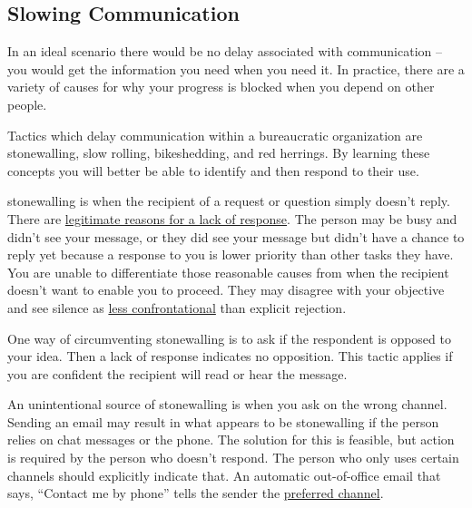 \subsection*{Slowing Communication\label{sec:slowing-communication}}

In an ideal scenario there would be no delay associated with communication -- you would get the information you need when you need it. In practice, there are a variety of causes for why your progress is blocked when you depend on other people. 

Tactics which delay communication within a bureaucratic organization are stonewalling, slow rolling, bikeshedding, and red herrings. By learning these concepts you will better be able to identify and then respond to their use.

\Gls{stonewalling} 
is when the recipient of a request or question simply doesn't reply. There are \hyperref[sec:email-responsiveness]{legitimate reasons for a lack of response}. 
The person may be busy and didn't see your message, or they did see your message but didn't have a chance to reply yet because a response to you is lower priority than other tasks they have. You are unable to differentiate those reasonable causes from when the recipient doesn't want to enable you to proceed. They may disagree with your objective and see silence as \href{https://en.wikipedia.org/wiki/Passive-aggressive_behavior}{less confrontational}
than explicit rejection. 

One way of circumventing stonewalling is to ask if the respondent is opposed to your idea. 
Then a lack of response indicates no opposition. This tactic applies if you are confident the recipient will read or hear the message.

An unintentional source of stonewalling is when you ask on the wrong channel. Sending an email may result in what appears to be stonewalling if the person relies on chat messages or the phone. The solution for this 
is feasible, but action is required by the person who doesn't respond. The person who only uses certain channels should explicitly indicate that. An automatic out-of-office email that says, ``Contact me by phone'' tells the sender the \hyperref[sec:communication-preferences]{preferred channel}. 

